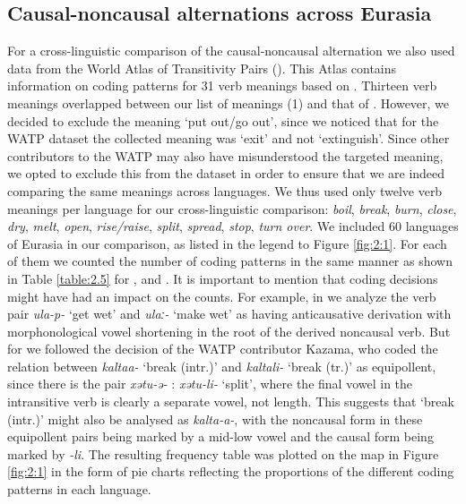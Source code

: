 \documentclass[output=paper,colorlinks,citecolor=brown]{langscibook}
\begin{document}
\subsection{Causal-noncausal alternations across Eurasia}\label{section2.5.2}

For a cross-linguistic comparison of the  causal-noncausal alternation we also used data from the World Atlas of Transitivity Pairs (\citeyear{Atlas2014}). This Atlas contains information on coding patterns for 31 verb meanings based on \citet[104]{Haspelmath1993}. Thirteen verb meanings overlapped between our list of meanings (1) and that of \citet{Haspelmath1993}. However, we decided to exclude the meaning ‘put out/go out’, since we noticed that for the  WATP dataset the collected meaning was ‘exit’ and not ‘extinguish’. Since other contributors to the WATP may also have misunderstood the targeted meaning, we opted to exclude this from the dataset in order to ensure that we are indeed comparing the same meanings across languages. We thus used only twelve verb meanings per language for our cross-linguistic comparison: \textit{boil}, \textit{break}, \textit{burn}, \textit{close}, \textit{dry}, \textit{melt}, \textit{open}, \textit{rise/raise}, \textit{split}, \textit{spread}, \textit{stop}, \textit{turn over}. We included 60 languages of Eurasia in our comparison, as listed in the legend to Figure \ref{fig:2:1}. For each of them we counted the number of coding patterns in the same manner as shown in Table \ref{table:2.5} for ,  and . It is important to mention that coding decisions might have had an impact on the counts. For example, in  we analyze the verb pair \textit{ula-p-} ‘get wet’ and \textit{ulaː-} ‘make wet’ as having anticausative derivation with morphonological vowel shortening in the root of the derived noncausal verb. But for  we followed the decision of  the WATP contributor Kazama, who coded the relation between \textit{kaltaa-} ‘break (intr.)’ and \textit{kaltali-} ‘break (tr.)’ as equipollent, since there is the pair \textit{xətu-ə-} : \textit{xətu-li-} ‘split’, where the final vowel in the intransitive verb is clearly a separate vowel, not length. This suggests that ‘break (intr.)’ might also be analysed as \textit{kalta-a-}, with the noncausal form in these equipollent pairs being marked by a mid-low vowel and the causal form being marked by \textit{-li}. The resulting frequency table was plotted on the map in Figure \ref{fig:2:1} in the form of pie charts reflecting the proportions of the different coding patterns in each language.
\end{document}
